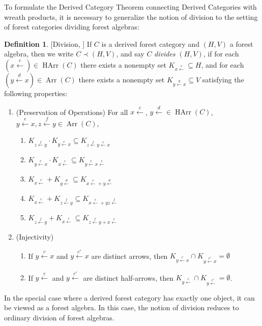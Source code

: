 \documentclass[sigplan,9pt]{acmart}\settopmatter{printfolios=true,printccs=false,printacmref=false}
\newcounter{thm}
\newcounter{theorem}
\theoremstyle{definition}
\newtheorem{defin}[thm]{Definition}
\newcommand{\carrow}[3]{#3 \xleftarrow{#2} #1 }
\newcommand{\HArr}[0]{{\operatorname{HArr}}}
\newcommand{\Arr}[0]{{\operatorname{Arr}}}
\begin{document}
To formulate the Derived Category Theorem connecting Derived Categories with wreath products, it is necessary to generalize the notion of division to the setting of forest categories dividing forest algebras:

\begin{defin}\label{def:division}[Division, \cite{straubing-forest-2018}]
If $C$ is a derived forest category and $(H,V)$ a forest algebra, then we write $C\prec(H,V)$, and say $C$ \emph{divides} $(H,V)$, if for each $\left(\carrow{}{c}{x}\right) \in \HArr(C)$ there exists a nonempty set $K_{\carrow{}{c}x} \subseteq H$, and for each $\left(\carrow{x}{d}{y}\right)\in \Arr(C)$ there exists a nonempty set $K_{\carrow{x}{d}{y}}\subseteq V$ satisfying the following properties:
\begin{enumerate}
\item (Preservation of Operations) For all $\carrow{}{c}x$, $\carrow{}{d}y \in \HArr(C)$, $\carrow{x}{e}{y}, \carrow{y}{f}{z} \in \Arr(C)$,
\begin{enumerate}
\item $K_{\carrow{y}{f}{z}} \cdot K_{\carrow{x}{e}{y}} \subseteq K_{\carrow{\carrow{x}{e}{y}}{f}{z}}$
\item $K_{\carrow{x}{e}y} \cdot K_{\carrow{}{c} x} \subseteq K_{\carrow{\carrow{}{c}{x}}{e}{y}}$
\item $K_{\carrow{}{c}x}+K_{\carrow{}{d}y}\subseteq K_{\carrow{}{c}{x}+\carrow{}{d}{y}}$
\item $K_{\carrow{}{c}x} + K_{\carrow{y}{f}z} \subseteq K_{\carrow{}{c}x+y\carrow{}{f}z}$
\item $K_{\carrow{y}{f}z} + K_{\carrow{}{c}x} \subseteq K_{\carrow{y}{f}z+\carrow{}{c}x}$
\end{enumerate}
\item (Injectivity)
\begin{enumerate}
\item If $\carrow{x}{c}y$ and $\carrow{x}{c'}y$ are distinct arrows, then $K_{\carrow{x}{c}y}\cap K_{\carrow{x}{c'}y} = \emptyset$
\item If $\carrow{}{c}y$ and $\carrow{}{c'}y$ are distinct half-arrows, then $K_{\carrow{}{c}y}\cap K_{\carrow{}{c'}y}=\emptyset$.
\end{enumerate}
\end{enumerate}

\end{defin}

In the special case where a derived forest category has exactly one object, it can be viewed as a forest algebra.
In this case, the notion of division reduces to ordinary division of forest algebras.
\end{document}
